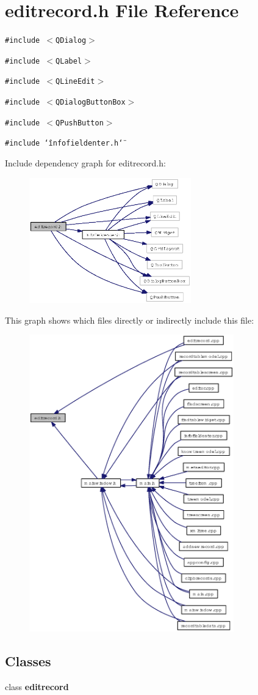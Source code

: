 \section{editrecord.h File Reference}
\label{editrecord_8h}
{\tt \#include $<$QDialog$>$}\par
{\tt \#include $<$QLabel$>$}\par
{\tt \#include $<$QLine\-Edit$>$}\par
{\tt \#include $<$QDialog\-Button\-Box$>$}\par
{\tt \#include $<$QPush\-Button$>$}\par
{\tt \#include \char`\"{}infofieldenter.h\char`\"{}}\par


Include dependency graph for editrecord.h:\begin{figure}[H]
\begin{center}
\leavevmode
\includegraphics[width=199pt]{editrecord_8h__incl}
\end{center}
\end{figure}


This graph shows which files directly or indirectly include this file:\begin{figure}[H]
\begin{center}
\leavevmode
\includegraphics[width=251pt]{editrecord_8h__dep__incl}
\end{center}
\end{figure}
\subsection*{Classes}
\begin{CompactItemize}
\item 
class {\bf editrecord}
\end{CompactItemize}
